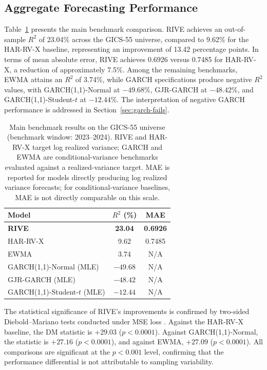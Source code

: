 \documentclass[review]{elsarticle}
\begin{document}
\subsection{Aggregate Forecasting Performance}\label{sec:aggregate}

Table~\ref{tab:main-results} presents the main benchmark comparison. RIVE achieves an out-of-sample $R^2$ of 23.04\% across the GICS-55 universe, compared to 9.62\% for the HAR-RV-X baseline, representing an improvement of 13.42 percentage points. In terms of mean absolute error, RIVE achieves 0.6926 versus 0.7485 for HAR-RV-X, a reduction of approximately 7.5\%. Among the remaining benchmarks, EWMA attains an $R^2$ of 3.74\%, while GARCH specifications produce negative $R^2$ values, with GARCH(1,1)-Normal at $-49.68\%$, GJR-GARCH at $-48.42\%$, and GARCH(1,1)-Student-$t$ at $-12.44\%$. The interpretation of negative GARCH performance is addressed in Section~\ref{sec:garch-fails}.

\begin{table}[t]
\centering
\caption{Main benchmark results on the GICS-55 universe (benchmark window: 2023--2024). RIVE and HAR-RV-X target log realized variance; GARCH and EWMA are conditional-variance benchmarks evaluated against a realized-variance target. MAE is reported for models directly producing log realized variance forecasts; for conditional-variance baselines, MAE is not directly comparable on this scale.}
\label{tab:main-results}
\begin{tabular}{lcc}
\hline
Model & $R^2$ (\%) & MAE \\
\hline
\textbf{RIVE} & \textbf{23.04} & \textbf{0.6926} \\
HAR-RV-X & 9.62 & 0.7485 \\
EWMA & 3.74 & N/A \\
GARCH(1,1)-Normal (MLE) & $-49.68$ & N/A \\
GJR-GARCH (MLE) & $-48.42$ & N/A \\
GARCH(1,1)-Student-$t$ (MLE) & $-12.44$ & N/A \\
\hline
\end{tabular}
\end{table}

The statistical significance of RIVE's improvements is confirmed by two-sided Diebold--Mariano tests conducted under MSE loss \cite{diebold1995}. Against the HAR-RV-X baseline, the DM statistic is $+29.03$ ($p < 0.0001$). Against GARCH(1,1)-Normal, the statistic is $+27.16$ ($p < 0.0001$), and against EWMA, $+27.09$ ($p < 0.0001$). All comparisons are significant at the $p < 0.001$ level, confirming that the performance differential is not attributable to sampling variability.
\end{document}
